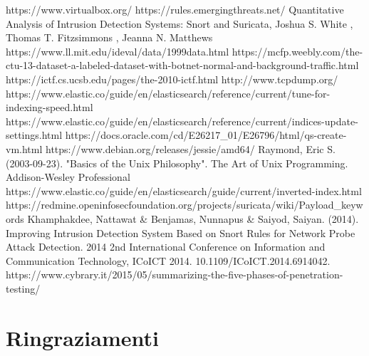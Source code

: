 \documentclass[12pt,a4paper,openright,twoside]{report}
\begin{document}
\begin{thebibliography}{90}
 https://www.virtualbox.org/
 https://rules.emergingthreats.net/
 Quantitative Analysis of Intrusion Detection Systems: Snort and Suricata, Joshua S. White , Thomas T. Fitzsimmons , Jeanna N. Matthews
 https://www.ll.mit.edu/ideval/data/1999data.html
 https://mcfp.weebly.com/the-ctu-13-dataset-a-labeled-dataset-with-botnet-normal-and-background-traffic.html
 https://ictf.cs.ucsb.edu/pages/the-2010-ictf.html
 http://www.tcpdump.org/
 https://www.elastic.co/guide/en/elasticsearch/reference/current/tune-for-indexing-speed.html
 https://www.elastic.co/guide/en/elasticsearch/reference/current/indices-update-settings.html
 https://docs.oracle.com/cd/E26217\_01/E26796/html/qs-create-vm.html
 https://www.debian.org/releases/jessie/amd64/
 Raymond, Eric S. (2003-09-23). "Basics of the Unix Philosophy". The Art of Unix Programming. Addison-Wesley Professional
 https://www.elastic.co/guide/en/elasticsearch/guide/current/inverted-index.html
 https://redmine.openinfosecfoundation.org/projects/suricata/wiki/Payload\_keywords
 Khamphakdee, Nattawat & Benjamas, Nunnapus & Saiyod, Saiyan. (2014). Improving Intrusion Detection System Based on Snort Rules for Network Probe Attack Detection. 2014 2nd International Conference on Information and Communication Technology, ICoICT 2014. 10.1109/ICoICT.2014.6914042.
 https://www.cybrary.it/2015/05/summarizing-the-five-phases-of-penetration-testing/
\end{thebibliography}
\clearpage{\pagestyle{empty}\cleardoublepage}
\chapter*{Ringraziamenti}
\thispagestyle{empty}
\end{document}
